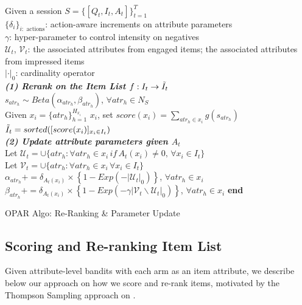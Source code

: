 \documentclass[11pt, dvipdfmx]{article}
\begin{document}
\begin{algorithm}[!t]
\SetAlgoLined
\KwIn
{\, \\
    \quad Given a session $S=\{{[Q_t, I_t, A_t]}\}_{t=1}^T$ \\ 
    \quad $\{\delta_i\}_{i: \text{ actions}}$: action-aware increments on attribute parameters\\
    \quad $\gamma$: hyper-parameter to control intensity on negatives \\
    \quad $\mathcal{U}_t$, $\mathcal{V}_t$: the associated attributes from engaged items; the associated attributes from impressed items \\
    \quad $|\cdot|_0$: cardinality operator\\
}
{
    \textbf{\textit{(1) Rerank on the Item List $f: I_{t}\rightarrow \Tilde{I}_t$}} \\
    \quad {}$s_{atr_h}\sim 
         Beta(\alpha_{atr_h},\beta_{atr_h})$, $\forall atr_h \in N_S$ \\
         
    {
        Given $x_i=\{atr_h\}_{h=1}^{H_{x_i}}$  $x_i$, set
        $score(x_i)=\sum_{atr_h \in x_i} g(s_{atr_h})$
    }
    $\Tilde{I}_{t}=sorted([score(x_i)]_{x_i\in I_{t}})$ \\
        \textbf{\textit{(2) Update attribute parameters given $A_t$}}\\
    Let $\mathcal{U}_t = \cup \{atr_h: \forall atr_h\in x_i\,if\,A_t(x_i) \neq 0,\,\forall x_i\in I_t\}$ \\
    Let $\mathcal{ V}_t = \cup \{atr_h: \forall atr_h\in x_i\, \forall x_i\in I_t\}$ \\
    {
        {
            $\alpha_{atr_h}+=\delta_{A_t(x_i)}\times \left\{1-Exp\left(-{|\mathcal{U}_t|_0}\right)\right\}$, $\forall atr_h \in x_i$
        }
        {
            $\beta_{atr_h}+= \delta_{A_t(x_i)}\times \left\{1-Exp\left(-\gamma{|\mathcal{V}_t\backslash \mathcal{U}_t|_0}\right)\right\}$, $\forall atr_h \in x_i$
        }
        {\textbf{end}}
    }
}
\caption{OPAR Algo: Re-Ranking \& Parameter Update}
\label{alg:update}
\end{algorithm}


\subsection{Scoring and Re-ranking Item List}\label{subsec:score_and_rank}
Given attribute-level bandits with each arm as an item attribute, we describe below our approach on how we score and re-rank items, motivated by the Thompson Sampling approach on \cite{agrawal2012analysis}. 
\end{document}
